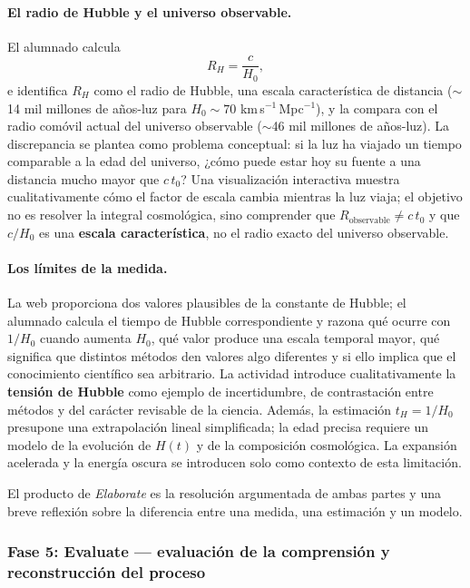 \paragraph{El radio de Hubble y el universo observable.} El alumnado calcula
\begin{equation}
R_H=\frac{c}{H_0},
\end{equation}
e identifica $R_H$ como el radio de Hubble, una escala característica de distancia ($\sim$14 mil millones de años-luz para $H_0\sim70$ km\,s$^{-1}$\,Mpc$^{-1}$), y la compara con el radio comóvil actual del universo observable ($\sim$46 mil millones de años-luz). La discrepancia se plantea como problema conceptual: si la luz ha viajado un tiempo comparable a la edad del universo, ¿cómo puede estar hoy su fuente a una distancia mucho mayor que $c\,t_0$? Una visualización interactiva muestra cualitativamente cómo el factor de escala cambia mientras la luz viaja; el objetivo no es resolver la integral cosmológica, sino comprender que $R_{\mathrm{observable}}\neq c\,t_0$ y que $c/H_0$ es una \textbf{escala característica}, no el radio exacto del universo observable.

\paragraph{Los límites de la medida.} La web proporciona dos valores plausibles de la constante de Hubble; el alumnado calcula el tiempo de Hubble correspondiente y razona qué ocurre con $1/H_0$ cuando aumenta $H_0$, qué valor produce una escala temporal mayor, qué significa que distintos métodos den valores algo diferentes y si ello implica que el conocimiento científico sea arbitrario. La actividad introduce cualitativamente la \textbf{tensión de Hubble} como ejemplo de incertidumbre, de contrastación entre métodos y del carácter revisable de la ciencia. Además, la estimación $t_H=1/H_0$ presupone una extrapolación lineal simplificada; la edad precisa requiere un modelo de la evolución de $H(t)$ y de la composición cosmológica. La expansión acelerada y la energía oscura se introducen solo como contexto de esta limitación.

El producto de \textit{Elaborate} es la resolución argumentada de ambas partes y una breve reflexión sobre la diferencia entre una medida, una estimación y un modelo.

\subsubsection{Fase 5: Evaluate --- evaluación de la comprensión y reconstrucción del proceso}\label{sec:evaluate}

